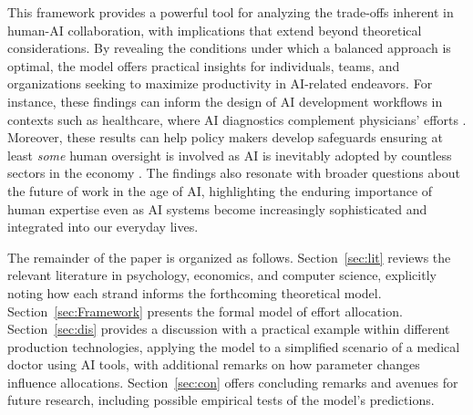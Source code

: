 This framework provides a powerful tool for analyzing the trade-offs inherent in human-AI collaboration, with implications that extend beyond theoretical considerations. By revealing the conditions under which a balanced approach is optimal, the model offers practical insights for individuals, teams, and organizations seeking to maximize productivity in AI-related endeavors. For instance, these findings can inform the design of AI development workflows in contexts such as healthcare, where AI diagnostics complement physicians’ efforts \citep{lammermann2024managing}. Moreover, these results can help policy makers develop safeguards ensuring at least \textit{some} human oversight is involved as AI is inevitably adopted by countless sectors in the economy \citep{agrawal2019economics}. The findings also resonate with broader questions about the future of work in the age of AI, highlighting the enduring importance of human expertise even as AI systems become increasingly sophisticated and integrated into our everyday lives.

The remainder of the paper is organized as follows. Section~\ref{sec:lit} reviews the relevant literature in psychology, economics, and computer science, explicitly noting how each strand informs the forthcoming theoretical model. Section~\ref{sec:Framework} presents the formal model of effort allocation. Section~\ref{sec:dis} provides a discussion with a practical example within different production technologies, applying the model to a simplified scenario of a medical doctor using AI tools, with additional remarks on how parameter changes influence allocations. Section~\ref{sec:con} offers concluding remarks and avenues for future research, including possible empirical tests of the model’s predictions.